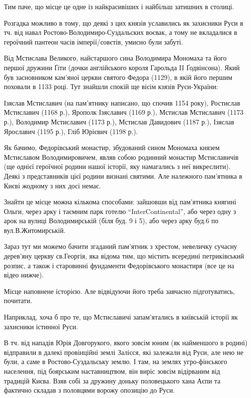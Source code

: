 Тим паче, що місце це одне із найкрасивіших і найбільш затишних в столиці. 

Розгадка можливо в тому, що деякі з цих князів уславились як захисники Руси в
тч. від навал Ростово-Володимиро-Суздальских воєвак, а тому не вкладалися в
героїчний пантеон часів імперії/совєтів, умисно були забуті.

Від Мстислава Великого, найстаршого сина Володимира Мономаха та його першої
дружини Ґіти (дочки англійського короля Гарольда II Ґодвінсона). Який був
засновником кам'яної церкви святого Федора (1129), в якій його першим поховали
в 1133 році. Тут знайшли спокій ще вісім кзязів Руси-України: 

Ізяслав Мстиславич (на пам’ятнику написано, що спочив 1154 року), Ростислав
Мстиславич (1168 р.), Ярополк Ізяславич (1169 р.), Мстислав Мстиславич (1173
р.), Володимир Мстиславич (1173 р.), Мстислав Давидович (1187 р.), Ізяслав
Ярославич (1195 р.), Гліб Юрієвич (1198 р.). 

Як бачимо, Федорівський монастир, збудований сином Мономаха князем Мстиславом
Володимировичем, являв собою родинний монастир Мстиславичів (ще однієї
героїчної родини нашої історії, яку намагались з неї викреслити). Деякі з
представників цієї родини визнані святими. Але належного пам’ятника в Києві
жодному з них досі немає.

Знайти це місце можна кількома способами: зайшовши від пам’ятника княгині
Ольги, через арку і таємним парк готелю \enquote{InterContinental}, або через
одну з арок на вулиці Володимирській (біля буд. 9 і 5), або через арку буд.6 по
вул.В.Житомирській. 

Зараз тут ми можемо бачити згаданий пам’ятник з хрестом, невеличку сучасну
дерев’яну церкву св.Георгія, яка відома тим, що містить всередині петриківський
розпис, а також і старовинні фундаменти Федорівського монастиря (все це на
відео нижче). 

Місце наповнене історією. Але відвідуючи його треба завчасно підготуватись,
почитати.

Наприклад, хоча б про те, що Мстиславичі запам'ятались в київській історії як
захисники істинної Руси. 

В тч. від нападів Юрія Довгорукого, якого зовсім юним (як найменшого в родині)
відправили в далекі провінційні землі Залісся, які залежали від Руси, але нею
не були, а саме в Ростово-Суздальську землю. І там, на землях угро-фінського
населення, під боярським наставництвом, він виріс зовсім відірваним від
традицій Києва. Взяв собі за дружину доньку половецького хана Аєпи та фактично
складав з половцями ворожу опозицію до Руси. 

